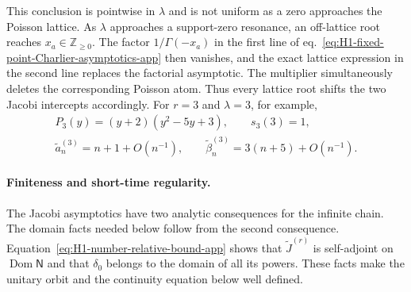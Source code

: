 \documentclass[a4paper,11pt]{article}
\def\Jac{J}%
\theoremstyle{definition}
\theoremstyle{remark}
\newcommand{\Jac}{\mathsf J}
\newcommand{\Dom}{\operatorname{Dom}}
\begin{document}
This conclusion is pointwise in \(\lambda\) and is not uniform as a
zero approaches the Poisson lattice. As \(\lambda\) approaches a
support-zero resonance, an off-lattice root reaches
\(x_a\in\mathbb Z_{\ge0}\). The factor \(1/\Gamma(-x_a)\) in the first line of
eq.~\eqref{eq:H1-fixed-point-Charlier-asymptotics-app} then vanishes,
and the exact lattice expression in the second line replaces the
factorial asymptotic. The multiplier simultaneously deletes the
corresponding Poisson atom. Thus every lattice root shifts the two Jacobi intercepts accordingly. For \(r=3\) and
\(\lambda=3\), for example, 
\begin{equation}
\begin{gathered}
   P_3(y)
   =(y+2)(y^2-5y+3),\qquad s_3(3)=1,\\
   \widetilde a_n^{(3)}
   =n+1+O(n^{-1}),\qquad
   \widetilde\beta_n^{(3)}
   =3(n+5)+O(n^{-1}).
\end{gathered}
   \label{eq:H1-r3-resonant-asymptotics-app}
\end{equation}

\paragraph{Finiteness and short-time regularity.}
The Jacobi asymptotics have two analytic consequences for the
infinite chain. The domain facts needed below follow from the second
consequence.  Equation~\eqref{eq:H1-number-relative-bound-app} shows that
$\widetilde{\Jac}^{(r)}$ is self-adjoint on $\Dom\mathsf N$ and that $\delta_0$ belongs to the
domain of all its powers.  These facts make the unitary orbit and the continuity equation below
well defined.
\end{document}
